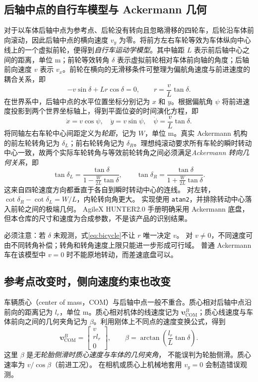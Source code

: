 \documentclass[UTF8,a4paper,fontset=fandol,11pt]{ctexart}
\newcommand{\vct}[1]{\bm #1}
\begin{document}
\subsection{后轴中点的自行车模型与 Ackermann 几何}
对于以车体后轴中点为参考点、后轮没有转向且忽略滑移的四轮车，后轮沿车体前向滚动，因此后轴中点的横向速度 $v_y$ 为零。将前方左右车轮等效为车体纵向中心线上的一个虚拟前轮，便得到\emph{自行车运动学模型}。其中轴距 $L$ 表示前后轴中心之间的距离，单位 m；前轮等效转角 $\delta$ 表示虚拟前轮相对车体前向轴的角度；后轴前向速度 $v$ 表示 $v_x$。前轮在横向的无滑移条件可整理为偏航角速度与前进速度的耦合关系，即
\begin{equation}
 -v\sin\delta+Lr\cos\delta=0,
 \qquad\boxed{r=\frac{v}{L}\tan\delta}.\label{eq:bicycle}
\end{equation}
在世界系中，后轴中点的水平位置坐标分别记为 $x$ 和 $y$。根据偏航角 $\psi$ 将前进速度投影到两个世界坐标轴上，得到平面位姿的时间演化方程，即
\begin{equation}
 \dot x=v\cos\psi,\quad \dot y=v\sin\psi,\quad
 \dot\psi=\frac{v}{L}\tan\delta.\label{eq:carode}
\end{equation}
将同轴左右车轮中心间距定义为\emph{轮距}，记为 $W$，单位 m。真实 Ackermann 机构的前左轮转角记为 $\delta_L$；前右轮转角记为 $\delta_R$。理想纯滚动要求所有车轮的瞬时转动中心一致，故两个实际车轮转角与等效前轮转角之间必须满足\emph{Ackermann 转向几何关系}，即
\begin{equation}\label{eq:ackermann}
 \tan\delta_L=\frac{\tan\delta}{1-\frac{W}{2L}\tan\delta},\qquad
 \tan\delta_R=\frac{\tan\delta}{1+\frac{W}{2L}\tan\delta}.
\end{equation}
这来自四轮速度方向都垂直于各自到瞬时转动中心的连线。
对左转，$\cot\delta_R-\cot\delta_L=W/L$，内轮转向角更大。
实现使用 \texttt{atan2}，并排除转动中心落入前轮之间的极端几何。
AgileX HUNTER2.0 手册明确采用 Ackermann 底盘\cite{hunter}，
但本仓库的尺寸和速度为合成参数，不是该产品的识别结果。

必须注意：若 $\delta$ 未观测，式\eqref{eq:bicycle}不让 $r$ 唯一决定 $v$。
对 $v\ne0$，不同速度可由不同转角补偿；转角和转角速度上限只能进一步形成可行域。
普通 Ackermann 车在该模型中 $v=0$ 时不能原地转动，而差速底盘可以。

\subsection{参考点改变时，侧向速度约束也改变}
车辆质心（center of mass，COM）与后轴中点一般不重合。质心相对后轴中点沿前向的距离记为 $l_r$，单位 m。质心相对机体的线速度记为 $\vct\upsilon_{\mathrm{COM}}^B$；质心线速度与车体前向之间的几何夹角记为 $\beta$。利用刚体上不同点的速度变换公式，得到
\begin{equation}
 \vct\upsilon_{\mathrm{COM}}^B=
 \begin{bmatrix}v\\r l_r\\0\end{bmatrix},\qquad
 \beta=\arctan\!\left(\frac{l_r}{L}\tan\delta\right).
\end{equation}
这里 $\beta$ 是\emph{无轮胎侧滑时质心速度与车体的几何夹角}，
不能误判为轮胎侧滑。质心速率为 $v/\cos\beta$（前进工况）。
在相机或质心上机械地套用 $v_y=0$ 会制造错误观测。
\end{document}

